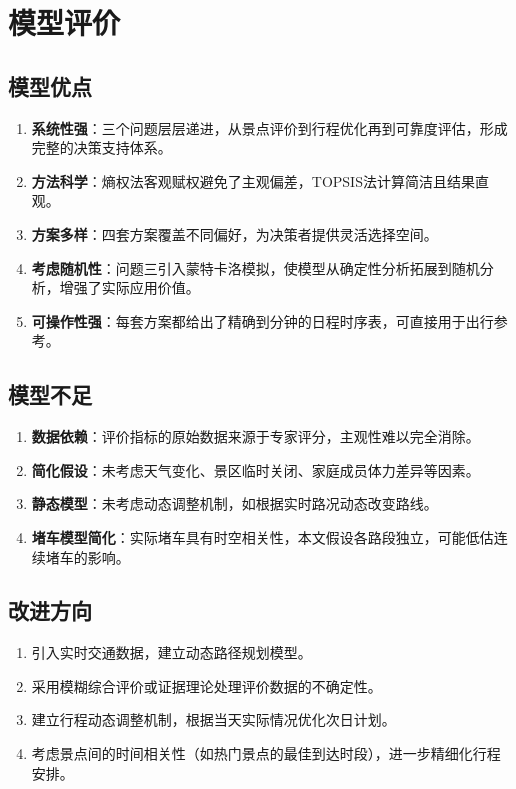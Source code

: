 \documentclass[12pt,a4paper]{ctexart}
\begin{document}
\section{模型评价}

\subsection{模型优点}

\begin{enumerate}
    \item \textbf{系统性强}：三个问题层层递进，从景点评价到行程优化再到可靠度评估，形成完整的决策支持体系。
    \item \textbf{方法科学}：熵权法客观赋权避免了主观偏差，TOPSIS法计算简洁且结果直观。
    \item \textbf{方案多样}：四套方案覆盖不同偏好，为决策者提供灵活选择空间。
    \item \textbf{考虑随机性}：问题三引入蒙特卡洛模拟，使模型从确定性分析拓展到随机分析，增强了实际应用价值。
    \item \textbf{可操作性强}：每套方案都给出了精确到分钟的日程时序表，可直接用于出行参考。
\end{enumerate}

\subsection{模型不足}

\begin{enumerate}
    \item \textbf{数据依赖}：评价指标的原始数据来源于专家评分，主观性难以完全消除。
    \item \textbf{简化假设}：未考虑天气变化、景区临时关闭、家庭成员体力差异等因素。
    \item \textbf{静态模型}：未考虑动态调整机制，如根据实时路况动态改变路线。
    \item \textbf{堵车模型简化}：实际堵车具有时空相关性，本文假设各路段独立，可能低估连续堵车的影响。
\end{enumerate}

\subsection{改进方向}

\begin{enumerate}
    \item 引入实时交通数据，建立动态路径规划模型。
    \item 采用模糊综合评价或证据理论处理评价数据的不确定性。
    \item 建立行程动态调整机制，根据当天实际情况优化次日计划。
    \item 考虑景点间的时间相关性（如热门景点的最佳到达时段），进一步精细化行程安排。
\end{enumerate}
\end{document}
